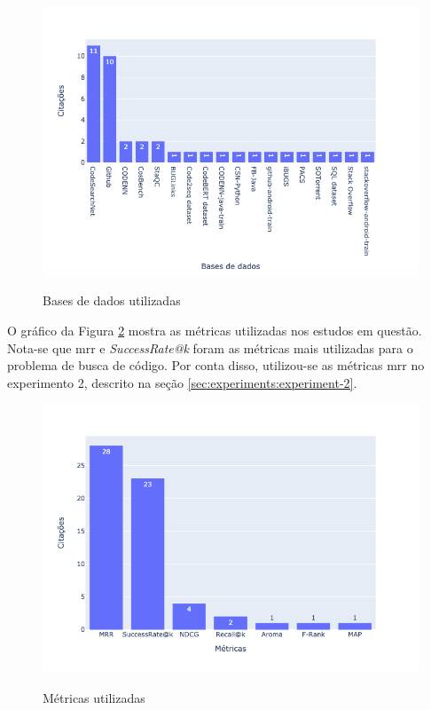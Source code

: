 \begin{figure}[H]
    \centering
    \caption{Bases de dados utilizadas}
    \includegraphics[scale=0.7]{./imagens/trabalhos-relacionados/databases.png}
    \label{fig:related-datasets}
\end{figure}

O gráfico da Figura \ref{fig:related-metrics} mostra as métricas utilizadas nos estudos em questão. Nota-se que \gls{mrr} e \textit{SuccessRate@k} foram as métricas mais utilizadas para o problema de busca de código. Por conta disso, utilizou-se as métricas \gls{mrr} no experimento 2, descrito na seção \ref{sec:experiments:experiment-2}.
\begin{figure}[H]
    \centering
        \caption{Métricas utilizadas}
        \includegraphics[scale=0.7]{./imagens/trabalhos-relacionados/ir_metrics.png}
        \label{fig:related-metrics}
\end{figure}

